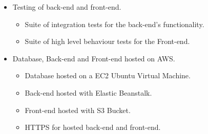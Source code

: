 \begin{itemize}
\begin{itemize}
    \end{itemize}
    \item Testing of back-end and front-end. \checkmark
    \begin{itemize}
        \item Suite of integration tests for the back-end's functionality. \checkmark 
        \item Suite of high level behaviour tests for the Front-end. \checkmark 
    \end{itemize}
    \item Database, Back-end and Front-end hosted on AWS. \checkmark 
    \begin{itemize} 
        \item Database hosted on a EC2 Ubuntu Virtual Machine. \checkmark 
        \item Back-end hosted with Elastic Beanstalk. \checkmark 
        \item Front-end hosted with S3 Bucket. \checkmark 
        \item HTTPS for hosted back-end and front-end. \checkmark 
    \end{itemize}
\end{itemize}